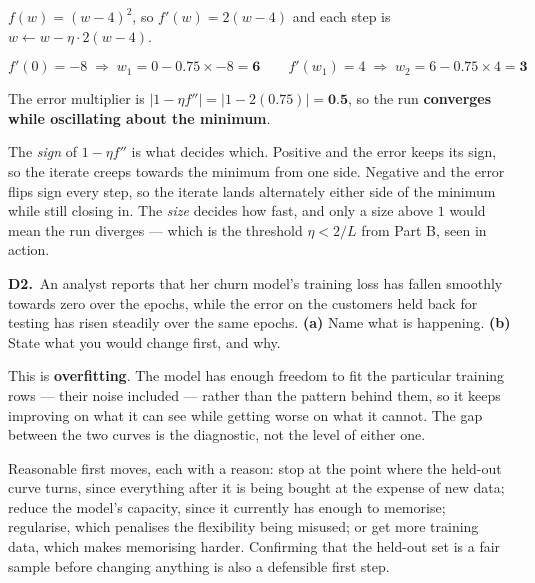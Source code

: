 \documentclass[10pt,a4paper]{article}
\newcommand{\sol}[1]{\textbf{#1}}
\begin{document}
\vspace{2pt}

$f(w) = (w-4)^2$, so $f'(w) = 2(w-4)$ and each step is $w \leftarrow w - \eta \cdot 2(w-4)$.

\[ f'(0) = -8 \;\Rightarrow\; w_1 = 0 - 0.75 \times -8 = \sol{6} \qquad f'(w_1) = 4 \;\Rightarrow\; w_2 = 6 - 0.75 \times 4 = \sol{3} \]

The error multiplier is $\lvert 1 - \eta f'' \rvert = \lvert 1 - 2(0.75) \rvert = \sol{0.5}$, so the run \sol{converges while oscillating about the minimum}.

\vspace{2pt}

The \emph{sign} of $1 - \eta f''$ is what decides which. Positive and the error keeps its sign, so the iterate creeps towards the minimum from one side. Negative and the error flips sign every step, so the iterate lands alternately either side of the minimum while still closing in. The \emph{size} decides how fast, and only a size above $1$ would mean the run diverges --- which is the threshold $\eta < 2/L$ from Part B, seen in action.

\vspace{6pt}

\textbf{D2.}\ An analyst reports that her churn model's training loss has fallen smoothly towards zero over the epochs, while the error on the customers held back for testing has risen steadily over the same epochs. \textbf{(a)} Name what is happening. \textbf{(b)} State what you would change first, and why.

\vspace{2pt}

This is \textbf{overfitting}. The model has enough freedom to fit the particular training rows --- their noise included --- rather than the pattern behind them, so it keeps improving on what it can see while getting worse on what it cannot. The gap between the two curves is the diagnostic, not the level of either one.\par\vspace{1mm}Reasonable first moves, each with a reason: stop at the point where the held-out curve turns, since everything after it is being bought at the expense of new data; reduce the model's capacity, since it currently has enough to memorise; regularise, which penalises the flexibility being misused; or get more training data, which makes memorising harder. Confirming that the held-out set is a fair sample before changing anything is also a defensible first step.
\end{document}
